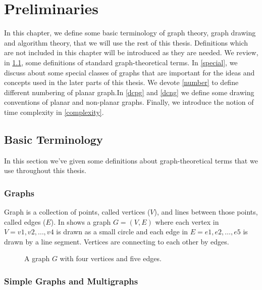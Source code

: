 \chapter{Preliminaries}
\label{preliminaries}


In this chapter, we define some basic terminology of graph theory, graph
drawing and algorithm theory, that we will use the rest of this
thesis. Definitions which are not included in this chapter will be introduced
as they are needed. We review, in \ref{basic}, some definitions of standard
graph-theoretical terms. In \ref{special}, we discuss about some special classes
of graphs that are important for the ideas and concepts used in the later
parts of this thesis. We devote \ref{number} to define different numbering of planar graph.In \ref{dcpg} and \ref{dcng} we define some
drawing conventions of planar and non-planar graphs. Finally, we introduce
the notion of time complexity in \ref{complexity}.




\section{Basic Terminology}
\label{basic}

In this section we've given some definitions about graph-theoretical terms that we
use throughout this thesis.

\subsection{Graphs}

Graph is a collection of points, called vertices ($V$), and lines between those points, called edges ($E$). In  shows a graph $G = (V, E)$ where each vertex in $ V = {v1, v2, \ldots , v4}$
is drawn as a small circle and each edge in $E = {e1, e2, \ldots , e5}$ is drawn by
a line segment. Vertices are connecting to each other by edges.

\begin{figure}[!tb]
  \centering
\resizebox{40mm}{!}{}
\caption{A graph $G$ with four vertices and five edges.}
\label{fig:graph}
\end{figure}








\subsection{Simple Graphs and Multigraphs}

